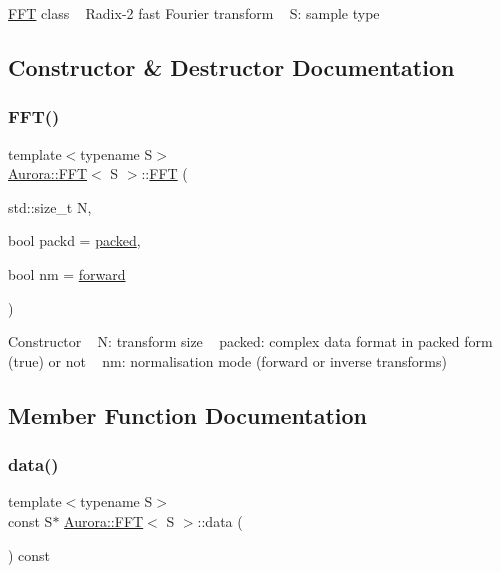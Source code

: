 \hyperlink{class_aurora_1_1_f_f_t}{F\+FT} class ~\newline
Radix-\/2 fast Fourier transform ~\newline
S\+: sample type 

\subsection{Constructor \& Destructor Documentation}
\mbox{\label{class_aurora_1_1_f_f_t_a358d44bb84dac04a3f6ab13aefdceaf4}} 
\subsubsection{\texorpdfstring{F\+F\+T()}{FFT()}}
{\footnotesize\ttfamily template$<$typename S$>$ \\
\hyperlink{class_aurora_1_1_f_f_t}{Aurora\+::\+F\+FT}$<$ S $>$\+::\hyperlink{class_aurora_1_1_f_f_t}{F\+FT} (\begin{DoxyParamCaption}\item[{std\+::size\+\_\+t}]{N,  }\item[{bool}]{packd = {\ttfamily \hyperlink{namespace_aurora_a3e70ffc9ea5c526dcd66b1b14e43f175}{packed}},  }\item[{bool}]{nm = {\ttfamily \hyperlink{namespace_aurora_a20b1bd3f1b34b8676e26d07718dac352}{forward}} }\end{DoxyParamCaption})\hspace{0.3cm}{\ttfamily [inline]}}

Constructor ~\newline
N\+: transform size ~\newline
packed\+: complex data format in packed form (true) or not ~\newline
nm\+: normalisation mode (forward or inverse transforms) 

\subsection{Member Function Documentation}
\mbox{\label{class_aurora_1_1_f_f_t_a7462e77c06228475f0f491d7a25d7bba}} 
\subsubsection{\texorpdfstring{data()}{data()}}
{\footnotesize\ttfamily template$<$typename S$>$ \\
const S$\ast$ \hyperlink{class_aurora_1_1_f_f_t}{Aurora\+::\+F\+FT}$<$ S $>$\+::data (\begin{DoxyParamCaption}{ }\end{DoxyParamCaption}) const\hspace{0.3cm}{\ttfamily [inline]}}

